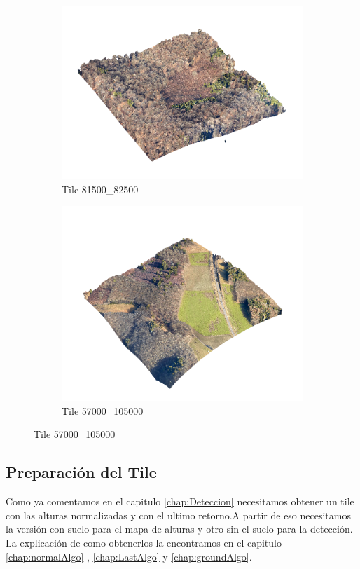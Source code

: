 \begin{figure}[h]
  \begin{subfigure}{0.5\textwidth}
    \centering
    \includegraphics[scale=0.30]{imaxes/tile1.png}
    \caption{Tile 81500\_82500}
    \label{fig:tile1}
  \end{subfigure}
  \begin{subfigure}{0.5\textwidth}
    \centering
    \includegraphics[scale=0.30]{imaxes/tile2.png}
    \caption{Tile 57000\_105000}
    \label{fig:tile2}
  \end{subfigure}
  \label{fig:restiles}
\end{figure}

\subsection{Preparación del Tile}
Como ya comentamos en el capitulo \ref{chap:Deteccion} necesitamos obtener un tile con las alturas normalizadas y con el ultimo retorno.A partir de eso necesitamos la versión con suelo para el mapa de alturas y otro sin el suelo para la detección. La explicación de como obtenerlos la encontramos en el capitulo \ref{chap:normalAlgo} , \ref{chap:LastAlgo} y \ref{chap:groundAlgo}.

